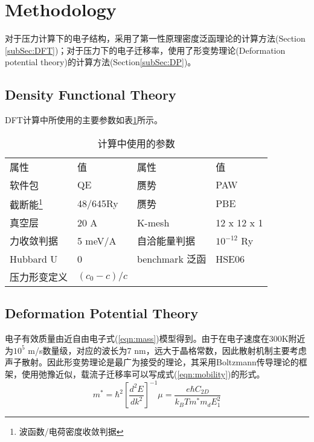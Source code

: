 \documentclass[reprint, aps, prb, showkeys]{revtex4-2}
\begin{document}
\section{Methodology}
对于压力计算下的电子结构，采用了第一性原理密度泛函理论的计算方法(Section \ref{subSec:DFT})；对于压力下的电子迁移率，使用了形变势理论(Deformation potential theory)的计算方法(Section\ref{subSec:DP})。
\subsection{Density Functional Theory \label{subSec:DFT}}
DFT计算中所使用的主要参数如表\ref{Tab:DFTparameter}所示。
\begin{table}[b]
    \caption{\label{Tab:DFTparameter} 计算中使用的参数} 
\begin{ruledtabular}
    \begin{tabular}{llll}
    \textrm{属性}&
    \textrm{值}&
    \textrm{属性}&
    \textrm{值}\\
    软件包          & QE        & 赝势              & PAW \\
    截断能\footnote{波函数/电荷密度收敛判据}& 48/645Ry  & 赝势              & PBE \\
    真空层          & 20 A      & K-mesh            & 12 x 12 x 1 \\
    力收敛判据      & 5 meV/A   & 自洽能量判据      & $10^{-12}$ Ry \\
    Hubbard U       & 0         & benchmark 泛函    & HSE06 \\
    压力形变定义     & $(c_0 - c)/c$ &  &  \\  
    \end{tabular}
\end{ruledtabular}
\end{table}

\subsection{Deformation Potential Theory \label{subSec:DP}}
电子有效质量由近自由电子式(\ref{eqn:mass})模型得到。由于在电子速度在300K附近为$10^{5}$ m/s数量级，对应的波长为7 nm，远大于晶格常数，因此散射机制主要考虑声子散射。因此形变势理论是最广为接受的理论，其采用Boltzmann传导理论的框架，使用弛豫近似，载流子迁移率可以写成式(\ref{eqn:mobility})的形式。
\begin{subequations}
\begin{equation}
    m^{*} = \hbar^2 [\frac{d^2E}{dk^2}]^{-1}
    \label{eqn:mass}
\end{equation}

\begin{equation}
    \mu = \frac{e{\hbar}C_{2D}}{k_B Tm^{*}m_d E_1^2}
    \label{eqn:mobility}
\end{equation}
\end{subequations}
\end{document}
